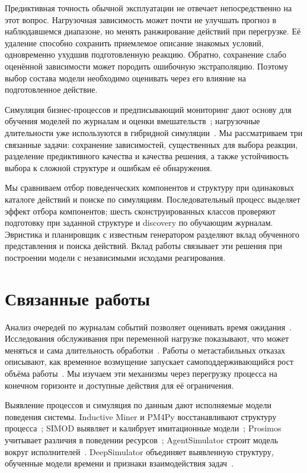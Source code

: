 Предиктивная точность обычной эксплуатации не отвечает непосредственно на этот вопрос. Нагрузочная зависимость может почти не улучшать прогноз в наблюдавшемся диапазоне, но менять ранжирование действий при перегрузке. Её удаление способно сохранить приемлемое описание знакомых условий, одновременно ухудшив подготовленную реакцию. Обратно, сохранение слабо оценённой зависимости может породить ошибочную экстраполяцию. Поэтому выбор состава модели необходимо оценивать через его влияние на подготовленное действие.

Симуляция бизнес-процессов и предписывающий мониторинг дают основу для обучения моделей по журналам и оценки вмешательств~\cite{simod,alarms,hybridpolicy,rlpolicies}; нагрузочные длительности уже используются в гибридной симуляции~\cite{deepsimulator,hybridpolicy}. Мы рассматриваем три связанные задачи: сохранение зависимостей, существенных для выбора реакции, разделение предиктивного качества и качества решения, а также устойчивость выбора к сложной структуре и ошибкам её обнаружения.

Мы сравниваем отбор поведенческих компонентов и структуру при одинаковых каталоге действий и поиске по симуляциям. Последовательный процесс выделяет эффект отбора компонентов; шесть сконструированных классов проверяют подготовку при заданной структуре и discovery по обучающим журналам. Эвристика и планировщик с известным генератором разделяют вклад обученного представления и поиска действий. Вклад работы связывает эти решения при построении модели с независимыми исходами реагирования.

\section{Связанные работы}
Анализ очередей по журналам событий позволяет оценивать время ожидания~\cite{queue}. Исследования обслуживания при переменной нагрузке показывают, что может меняться и сама длительность обработки~\cite{load}. Работы о метастабильных отказах описывают, как временное возмущение запускает самоподдерживающийся рост объёма работы~\cite{metastable}. Мы изучаем эти механизмы через перегрузку процесса на конечном горизонте и доступные действия для её ограничения.

Выявление процессов и симуляция по данным дают исполняемые модели поведения системы. Inductive Miner и PM4Py восстанавливают структуру процесса~\cite{inductive,pm4py}; SIMOD выявляет и калибрует имитационные модели~\cite{simod}; Prosimos учитывает различия в поведении ресурсов~\cite{prosimos}; AgentSimulator строит модель вокруг исполнителей~\cite{agents}. DeepSimulator объединяет выявленную структуру, обученные модели времени и признаки взаимодействия задач~\cite{deepsimulator}. 

